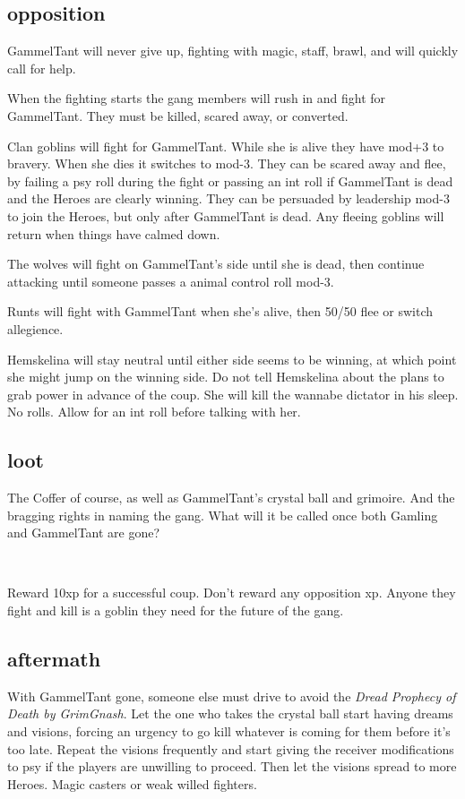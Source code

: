 \subsection*{opposition}

GammelTant will never give up, fighting with magic, staff, brawl, and will quickly call for help.

When the fighting starts the gang members will rush in and fight for GammelTant. They must be killed, scared away, or converted. 

Clan goblins will fight for GammelTant. While she is alive they have mod+3 to bravery. When she dies it switches to mod-3.
They can be scared away and flee, by failing a psy roll during the fight or passing an int roll if GammelTant is dead and the Heroes are clearly winning.
They can be persuaded by leadership mod-3 to join the Heroes, but only after GammelTant is dead.
Any fleeing goblins will return when things have calmed down.

The wolves will fight on GammelTant's side until she is dead, then continue attacking until someone passes a animal control roll mod-3.

Runts will fight with GammelTant when she's alive, then 50/50 flee or switch allegience. 

Hemskelina will stay neutral until either side seems to be winning, at which point she might jump on the winning side. Do not tell Hemskelina about the plans to grab power in advance of the coup. She will kill the wannabe dictator in his sleep. No rolls. Allow for an int roll before talking with her.


\subsection*{loot}

The Coffer of course, as well as GammelTant's crystal ball and grimoire. And the bragging rights in naming the gang. What will it be called once both Gamling and GammelTant are gone?

\

Reward 10xp for a successful coup. Don't reward any opposition xp. Anyone they fight and kill is a goblin they need for the future of the gang.


\subsection*{aftermath}
\label{coupaftermath}

With GammelTant gone, someone else must drive to avoid the \emph{Dread Prophecy of Death by GrimGnash}. Let the one who takes the crystal ball start having dreams and visions, forcing an urgency to go kill whatever is coming for them before it's too late. Repeat the visions frequently and start giving the receiver modifications to psy if the players are unwilling to proceed. Then let the visions spread to more Heroes. Magic casters or weak willed fighters.

